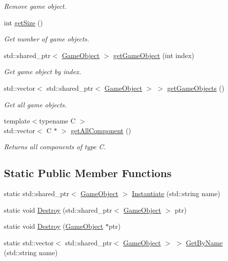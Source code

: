 \begin{DoxyCompactItemize}
\begin{DoxyCompactList}\small\item\em Remove game object. \end{DoxyCompactList}\item 
int \hyperlink{class_mason_1_1_scene_a97780dbb825e92c62b02623fe1e297fa}{get\+Size} ()
\begin{DoxyCompactList}\small\item\em Get number of game objects. \end{DoxyCompactList}\item 
std\+::shared\+\_\+ptr$<$ \hyperlink{class_mason_1_1_game_object}{Game\+Object} $>$ \hyperlink{class_mason_1_1_scene_ae13738888d4f00135fb827639f87239b}{get\+Game\+Object} (int index)
\begin{DoxyCompactList}\small\item\em Get game object by index. \end{DoxyCompactList}\item 
std\+::vector$<$ std\+::shared\+\_\+ptr$<$ \hyperlink{class_mason_1_1_game_object}{Game\+Object} $>$ $>$ \hyperlink{class_mason_1_1_scene_a045d786fa6f11ab01e190971637b15ce}{get\+Game\+Objects} ()
\begin{DoxyCompactList}\small\item\em Get all game objects. \end{DoxyCompactList}\item 
{\footnotesize template$<$typename C $>$ }\\std\+::vector$<$ C $\ast$ $>$ \hyperlink{class_mason_1_1_scene_a889caa86c1c4c8fad9416c7240148232}{get\+All\+Component} ()
\begin{DoxyCompactList}\small\item\em Returns all components of type C. \end{DoxyCompactList}\end{DoxyCompactItemize}
\subsection*{Static Public Member Functions}
\begin{DoxyCompactItemize}
\item 
static std\+::shared\+\_\+ptr$<$ \hyperlink{class_mason_1_1_game_object}{Game\+Object} $>$ \hyperlink{class_mason_1_1_scene_a3eee172075ff2b845caffc8e641f9d9c}{Instantiate} (std\+::string name)
\item 
static void \hyperlink{class_mason_1_1_scene_a4721fcf8438883759478aee25bf247c2}{Destroy} (std\+::shared\+\_\+ptr$<$ \hyperlink{class_mason_1_1_game_object}{Game\+Object} $>$ ptr)
\item 
static void \hyperlink{class_mason_1_1_scene_a8f395f22c024c0d5161cfa8e024f177d}{Destroy} (\hyperlink{class_mason_1_1_game_object}{Game\+Object} $\ast$ptr)
\item 
static std\+::vector$<$ std\+::shared\+\_\+ptr$<$ \hyperlink{class_mason_1_1_game_object}{Game\+Object} $>$ $>$ \hyperlink{class_mason_1_1_scene_a684a224fe56794d0db86da99947a6fac}{Get\+By\+Name} (std\+::string name)
\end{DoxyCompactItemize}
